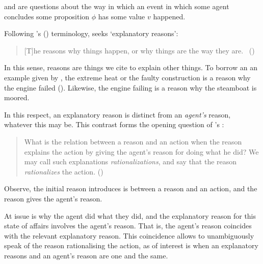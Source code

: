 \begin{note}
  \qWhy{} and \qHow{} are questions about the way in which an event in which some agent \vAgent{} concludes some proposition \(\phi\) has some value \(v\) happened.

  Following \citeauthor{Hieronymi:2011aa}'s (\citeyear{Hieronymi:2011aa}) terminology, \qWhy{} seeks `explanatory reasons':

  \begin{quote}
    [T]he reasons why things happen, or why things are the way they are.%
    \mbox{ }\hfill\mbox{(\citeyear[410]{Hieronymi:2011aa})}
  \end{quote}

  In this sense, reasons are things we cite to explain other things.
  To borrow an an example given by \citeauthor{Hieronymi:2011aa}, the extreme heat or the faulty construction is a reason why the engine failed (\citeyear[409]{Hieronymi:2011aa}).
  Likewise, the engine failing is a reason why the steamboat is moored.

  In this respect, an explanatory reason is distinct from an \emph{agent's} reason, whatever this may be.
  This contrast forms the opening question of \citeauthor{Davidson:1963aa}'s :

  \begin{quote}
    What is the relation between a reason and an action when the reason explains the action by giving the agent's reason for doing what he did?
    We may call such explanations \emph{rationalizations}, and say that the reason \emph{rationalizes} the action.%
    \mbox{}\hfill\mbox{(\citeyear[685]{Davidson:1963aa})}
  \end{quote}

  Observe, the initial reason \citeauthor{Davidson:1963aa} introduces is between a reason and an action, and the reason gives the agent's reason.

  At issue is why the agent did what they did, and the explanatory reason for this state of affairs involves the agent's reason.
  That is, the agent's reason coincides with the relevant explanatory reason.
  This coincidence allows \citeauthor{Davidson:1963aa} to unambiguously speak of the reason rationalising the action, as of interest is when an explanatory reasons and an agent's reason are one and the same.


\end{note}
